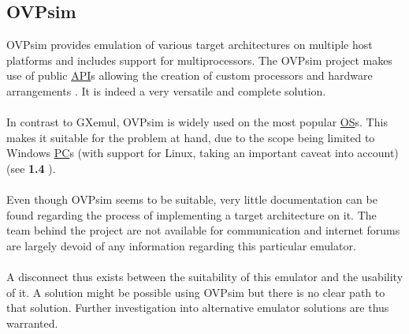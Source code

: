 \subsection{OVPsim}
\label{OVPsim}
OVPsim provides emulation of various target architectures on multiple host platforms and includes support for multiprocessors. The OVPsim project makes use of public \hyperref[listAbr]{API}s allowing the creation of custom processors and hardware arrangements \cite{Imperas2020}. It is indeed a very versatile and complete solution.
\\\\
In contrast to GXemul, OVPsim is widely used on the most popular \hyperref[listAbr]{OS}s. This makes it suitable for the problem at hand, due to the scope being limited to Windows \hyperref[listAbr]{PC}s (with support for Linux, taking an important caveat into account)(see \textbf{1.4 }).
\\\\
Even though OVPsim seems to be suitable, very little documentation can be found regarding the process of implementing a target architecture on it. The team behind the project are not available for communication and internet forums are largely devoid of any information regarding this particular emulator. 
\\\\
A disconnect thus exists between the suitability of this emulator and the usability of it. A solution might be possible using OVPsim but there is no clear path to that solution. Further investigation into alternative emulator solutions are thus warranted.

